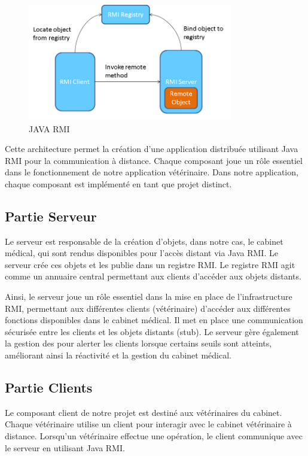 \documentclass{article} %
\begin{document}
\begin{figure}[h]
    \centering
    \includegraphics[width=0.8\textwidth]{rmi}
    \caption{JAVA RMI}
    \label{fig:schema-rmi}
\end{figure}

Cette architecture permet la création d'une application distribuée utilisant Java RMI
pour la communication à distance. Chaque composant joue un rôle essentiel dans le fonctionnement
de notre application vétérinaire.
Dans notre application, chaque composant est implémenté en tant que projet distinct.

\subsection{Partie Serveur}

Le serveur est responsable de la création d'objets, dans notre cas, le cabinet médical,
qui sont rendus disponibles pour l'accès distant via Java RMI.
Le serveur crée ces objets et les publie dans un registre RMI.
Le registre RMI agit comme un annuaire central permettant aux clients d'accéder aux objets distants.

Ainsi, le serveur joue un rôle essentiel dans la mise en place de l'infrastructure RMI,
permettant aux différentes clients (vétérinaire) d'accéder aux différentes fonctions disponibles
dans le cabinet médical. Il met en place une communication sécurisée entre les clients
et les objets distants (stub).
Le serveur gère également la gestion des  pour alerter les clients lorsque
certains seuils sont atteints, améliorant ainsi la réactivité et la gestion du cabinet médical.

\subsection{Partie Clients}

Le composant client de notre projet est destiné aux vétérinaires du cabinet.
Chaque vétérinaire utilise un client pour interagir avec le cabinet vétérinaire à distance.
Lorsqu'un vétérinaire effectue une opération, le client communique avec le serveur en utilisant Java RMI.
\end{document}
